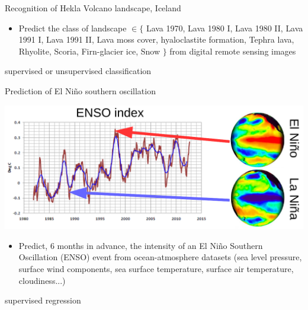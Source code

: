 \documentclass[pressentation,9pt,aspectratio=1610,xcolor=table]{beamer}
\newcommand{\doigt}{\noindent \Pisymbol{pzd}{43}}
\begin{document}
\begin{frame}{Recognition of Hekla Volcano landscape, Iceland}
  \begin{itemize}
  \item[\doigt] Predict the class of landscape $\in \{$ \textcolor{c1}{Lava 1970}, \textcolor{c2}{Lava 1980 I}, \textcolor{c3}{Lava 1980 II},  \textcolor{c4}{Lava 1991 I}, \textcolor{c5}{Lava 1991 II}, \textcolor{c6}{Lava moss cover}, \textcolor{c7}{hyaloclastite formation}, \textcolor{c8}{Tephra lava}, \textcolor{c9}{Rhyolite}, \textcolor{c10}{Scoria}, \textcolor{c11}{Firn-glacier ice}, \textcolor{c12}{Snow} $\}$ from digital remote sensing images
  \end{itemize}

\begin{center}
  \alert{supervised or unsupervised classification}
\end{center}
\end{frame}


\begin{frame}{Prediction of El Niño southern oscillation}
  \begin{center}
    \includegraphics[width=.8\linewidth]{ENSO_Nino_Nina.png}
  \end{center}

  \begin{itemize}
  \item[\doigt] Predict, 6 months in advance, the intensity of an El Niño Southern Oscillation (ENSO) event from ocean-atmosphere datasets (sea level pressure, surface wind components, sea surface temperature, surface air temperature, cloudiness...)
  \end{itemize}
  \begin{center}
    \alert{supervised regression}
  \end{center}
\end{frame}
\end{document}
